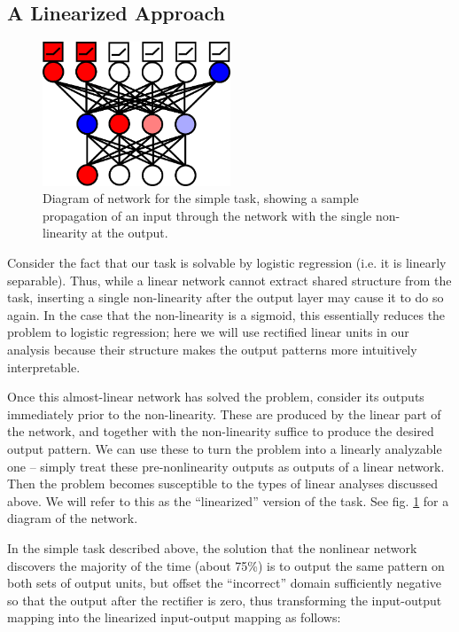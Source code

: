 \documentclass[10pt,letterpaper]{article}
\begin{document}
\subsection{A Linearized Approach}
\begin{figure}
\includegraphics[width=0.5\textwidth]{figures/network_diagram.png}
\caption{Diagram of network for the simple task, showing a sample propagation of an input through the network with the single non-linearity at the output.}
\label{network_diagram}
\end{figure}
Consider the fact that our task is solvable by logistic regression (i.e. it is linearly separable). Thus, while a linear network cannot extract shared structure from the task, inserting a single non-linearity after the output layer may cause it to do so again. In the case that the non-linearity is a sigmoid, this essentially reduces the problem to logistic regression; here we will use rectified linear units in our analysis because their structure makes the output patterns more intuitively interpretable. \par 
Once this almost-linear network has solved the problem, consider its outputs immediately prior to the non-linearity. These are produced by the linear part of the network, and together with the non-linearity suffice to produce the desired output pattern. We can use these to turn the problem into a linearly analyzable one -- simply treat these pre-nonlinearity outputs as outputs of a linear network. Then the problem becomes susceptible to the types of linear analyses discussed above. We will refer to this as the ``linearized'' version of the task. See fig. \ref{network_diagram} for a diagram of the network. \par 
In the simple task described above, the solution that the nonlinear network discovers the majority of the time (about 75\%) is to output the same pattern on both sets of output units, but offset the ``incorrect'' domain sufficiently negative so that the output after the rectifier is zero, thus transforming the input-output mapping into the linearized input-output mapping as follows:
\end{document}
